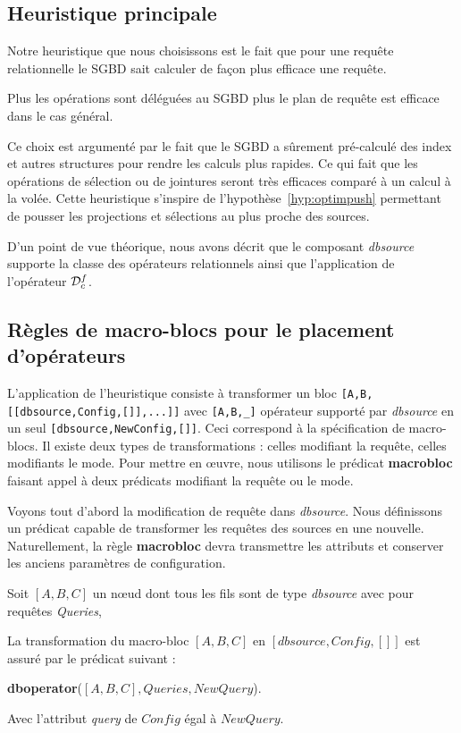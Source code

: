 \subsection{Heuristique principale}
Notre heuristique que nous choisissons est le fait que pour une requête relationnelle le SGBD sait calculer de façon plus efficace une requête. 
\begin{hyp}\label{hyp:sgbd}
    Plus les opérations sont déléguées au SGBD plus le plan de requête est efficace dans le cas général.
\end{hyp}
Ce choix est argumenté par le fait que le SGBD a sûrement pré-calculé des index et autres structures pour rendre les calculs plus rapides. Ce qui fait que les opérations de sélection ou de jointures seront très efficaces comparé à un calcul à la volée. Cette heuristique s'inspire de l'hypothèse~\ref{hyp:optimpush} permettant de pousser les projections et sélections au plus proche des sources.

D'un point de vue théorique, nous avons décrit que le composant \textit{dbsource} supporte la classe des opérateurs relationnels ainsi que l'application de l'opérateur $\mathcal{D}^f_c$. 

\subsection{Règles de macro-blocs pour le placement d'opérateurs}
L'application de l'heuristique consiste à transformer un bloc \lstinline|[A,B,[[dbsource,Config,[]],...]]| avec \lstinline|[A,B,_]| opérateur supporté par \textit{dbsource} en un seul \lstinline|[dbsource,NewConfig,[]]|. Ceci correspond à la spécification de macro-blocs. Il existe deux types de transformations : celles modifiant la requête, celles modifiants le mode. Pour mettre en œuvre, nous utilisons le prédicat \textbf{macrobloc} faisant appel à deux prédicats modifiant la requête ou le mode.

Voyons tout d'abord la modification de requête dans \textit{dbsource}. Nous définissons un prédicat capable de transformer les requêtes des sources en une nouvelle. Naturellement, la règle \textbf{macrobloc} devra transmettre les attributs et conserver les anciens paramètres de configuration.
\begin{regle}
    Soit $[A,B,C]$ un nœud dont tous les fils sont de type \textit{dbsource} avec pour requêtes \textit{Queries},

    La transformation du macro-bloc $[A,B,C]$ en $[dbsource,Config,[]]$ est assuré par le prédicat suivant :
    \begin{center} \textbf{dboperator}($[A,B,C], Queries, NewQuery$). \end{center}
    Avec l'attribut \textit{query} de $Config$ égal à $NewQuery$.
\end{regle}

